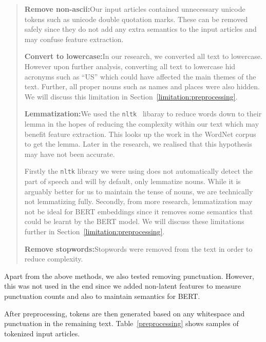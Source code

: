 \documentclass{article}
\begin{document}
\begin{quote}
  \textbf{Remove non-ascii:}\quad Our input articles contained unnecessary unicode tokens such as unicode double quotation marks. These can be removed safely since they do not add any extra semantics to the input articles and may confuse feature extraction.

  \textbf{Convert to lowercase:}\quad In our research, we converted all text to lowercase. However upon further analysis, converting all text to lowercase hid acronyms such as ``US'' which could have affected the main themes of the text. Further, all proper nouns such as names and places were also hidden. We will discuss this limitation in Section~\ref{limitation:preprocessing}.

  \textbf{Lemmatization:}\quad We used the \verb|nltk|~\cite{nltk} libaray to reduce words down to their lemma in the hopes of reducing the complexity within our text which may benefit feature extraction. This looks up the work in the WordNet corpus to get the lemma. Later in the research, we realised that this hypothesis may have not been accurate.

  Firstly the \verb|nltk| library we were using does not automatically detect the part of speech and will by default, only lemmatize nouns. While it is arguably better for us to maintain the tense of nouns, we are technically not lemmatizing fully. Secondly, from more research, lemmatization may not be ideal for BERT embeddings since it removes some semantics that could be learnt by the BERT model. We will discuss these limitations further in Section~\ref{limitation:preprocessing}.

  \textbf{Remove stopwords:}\quad Stopwords were removed from the text in order to reduce complexity.
\end{quote}

Apart from the above methods, we also tested removing punctuation. However, this was not used in the end since we added non-latent features to measure punctuation counts and also to maintain semantics for BERT.

After preprocessing, tokens are then generated based on any whitespace and punctuation in the remaining text. Table~\ref{preprocessing} shows samples of tokenized input articles.
\end{document}
